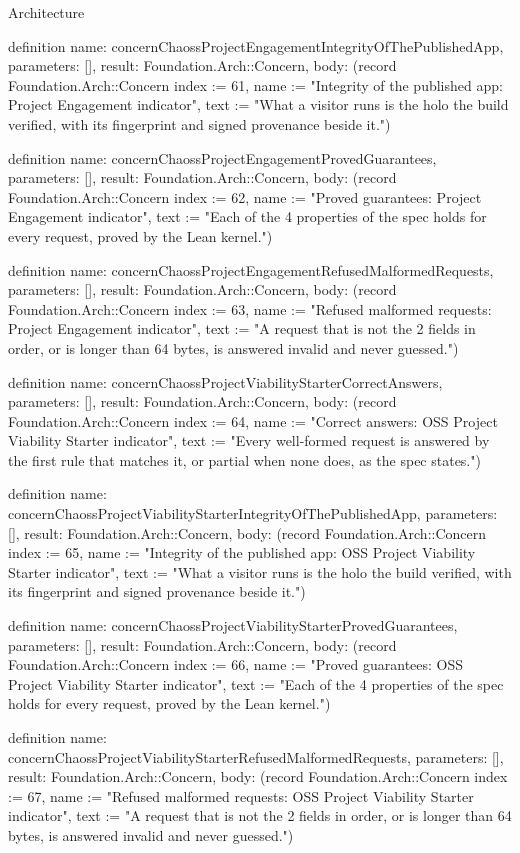 \begin{lexlean}{Architecture}
\begin{semanticmodule}
definition{
  name: concernChaossProjectEngagementIntegrityOfThePublishedApp,
  parameters: [],
  result: Foundation.Arch::Concern,
  body: (record Foundation.Arch::Concern {index := 61, name := "Integrity of the published app: Project Engagement indicator", text := "What a visitor runs is the holo the build verified, with its fingerprint and signed provenance beside it."})
}

definition{
  name: concernChaossProjectEngagementProvedGuarantees,
  parameters: [],
  result: Foundation.Arch::Concern,
  body: (record Foundation.Arch::Concern {index := 62, name := "Proved guarantees: Project Engagement indicator", text := "Each of the 4 properties of the spec holds for every request, proved by the Lean kernel."})
}

definition{
  name: concernChaossProjectEngagementRefusedMalformedRequests,
  parameters: [],
  result: Foundation.Arch::Concern,
  body: (record Foundation.Arch::Concern {index := 63, name := "Refused malformed requests: Project Engagement indicator", text := "A request that is not the 2 fields in order, or is longer than 64 bytes, is answered invalid and never guessed."})
}

definition{
  name: concernChaossProjectViabilityStarterCorrectAnswers,
  parameters: [],
  result: Foundation.Arch::Concern,
  body: (record Foundation.Arch::Concern {index := 64, name := "Correct answers: OSS Project Viability Starter indicator", text := "Every well-formed request is answered by the first rule that matches it, or partial when none does, as the spec states."})
}

definition{
  name: concernChaossProjectViabilityStarterIntegrityOfThePublishedApp,
  parameters: [],
  result: Foundation.Arch::Concern,
  body: (record Foundation.Arch::Concern {index := 65, name := "Integrity of the published app: OSS Project Viability Starter indicator", text := "What a visitor runs is the holo the build verified, with its fingerprint and signed provenance beside it."})
}

definition{
  name: concernChaossProjectViabilityStarterProvedGuarantees,
  parameters: [],
  result: Foundation.Arch::Concern,
  body: (record Foundation.Arch::Concern {index := 66, name := "Proved guarantees: OSS Project Viability Starter indicator", text := "Each of the 4 properties of the spec holds for every request, proved by the Lean kernel."})
}

definition{
  name: concernChaossProjectViabilityStarterRefusedMalformedRequests,
  parameters: [],
  result: Foundation.Arch::Concern,
  body: (record Foundation.Arch::Concern {index := 67, name := "Refused malformed requests: OSS Project Viability Starter indicator", text := "A request that is not the 2 fields in order, or is longer than 64 bytes, is answered invalid and never guessed."})
}


\end{semanticmodule}
\end{lexlean}
